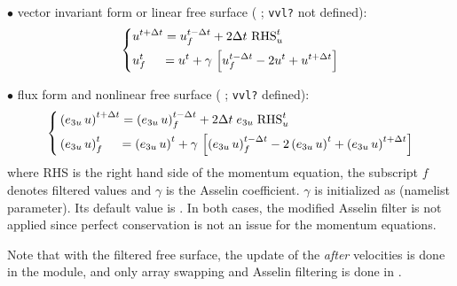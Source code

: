 \documentclass[../main/NEMO_manual]{subfiles}
\begin{document}
$\bullet$ vector invariant form or linear free surface
( ; \texttt{vvl?} not defined):
\[
  \left\{
    \begin{aligned}
      &u^{t+\Delta t} = u_f^{t-\Delta t} + 2\Delta t  \ \text{RHS}_u^t  	\\
      &u_f^t \;\quad = u^t+\gamma \,\left[ {u_f^{t-\Delta t} -2u^t+u^{t+\Delta t}} \right]
    \end{aligned}
  \right.
\]

$\bullet$ flux form and nonlinear free surface
( ; \texttt{vvl?} defined):
\[
  \left\{
    \begin{aligned}
      &\left(e_{3u}\,u\right)^{t+\Delta t} = \left(e_{3u}\,u\right)_f^{t-\Delta t} + 2\Delta t \; e_{3u} \;\text{RHS}_u^t  	\\
      &\left(e_{3u}\,u\right)_f^t \;\quad = \left(e_{3u}\,u\right)^t
      +\gamma \,\left[ {\left(e_{3u}\,u\right)_f^{t-\Delta t} -2\left(e_{3u}\,u\right)^t+\left(e_{3u}\,u\right)^{t+\Delta t}} \right]
    \end{aligned}
  \right.
\]
where RHS is the right hand side of the momentum equation,
the subscript $f$ denotes filtered values and $\gamma$ is the Asselin coefficient.
$\gamma$ is initialized as  (namelist parameter).
Its default value is .
In both cases, the modified Asselin filter is not applied since perfect conservation is not an issue for
the momentum equations.

Note that with the filtered free surface,
the update of the \textit{after} velocities is done in the  module,
and only array swapping and Asselin filtering is done in .

\subinc{}
\end{document}
